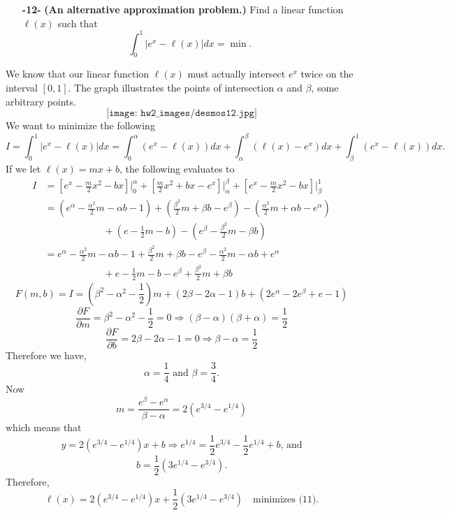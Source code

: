 \documentclass[11pt]{article}
\theoremstyle{definition}
\newcommand{\1}[1]{\mathbf{1} \left \{ #1 \right \}}
\begin{document}
\begin{itemize}
    \item[{\textbf{-12-}}] \textbf{(An alternative approximation problem.)}  Find a linear function $\ell(x)$ such that
    \begin{equation}
        \int_0^1 |e^x - \ell(x)| dx = \min.
    \end{equation}
\end{itemize}
We know that our linear function $\ell(x)$ must actually intersect $e^x$ twice on the interval $[0,1]$.  The graph illustrates the points of intersection $\alpha$ and $\beta$, some arbitrary points.
\[\texttt{[image: hw2\_images/desmos12.jpg]}\]
We want to minimize the following
\[I = \int_0^1 |e^x - \ell(x)| dx = \int_0^{\alpha} (e^x - \ell(x)) dx + \int_{\alpha}^{\beta} (\ell(x) - e^x) dx + \int_{\beta}^1 (e^x - \ell(x)) dx.\]
If we let $\ell(x) = mx+b$, the following evaluates to
\begin{equation*}
    \begin{split}
        I &= \left[e^x - \frac{m}{2}x^2 - bx\right]\bigg|_0^{\alpha} + \left[\frac{m}{2}x^2 + bx - e^x\right]\bigg|_{\alpha}^{\beta} + \left[e^x - \frac{m}{2}x^2 - bx\right]\bigg|_{\beta}^1 \\
        &= \left(e^{\alpha} - \frac{\alpha^2}{2}m - \alpha b - 1\right) + \left(\frac{\beta^2}{2}m + \beta b - e^{\beta}\right) - \left(\frac{\alpha^2}{2}m + \alpha b - e^{\alpha}\right) \\
        & \qquad \qquad \qquad + \left(e - \frac{1}{2}m - b\right) - \left(e^{\beta} - \frac{\beta^2}{2}m - \beta b\right) \\
        &= e^{\alpha} - \frac{\alpha^2}{2}m - \alpha b - 1 + \frac{\beta^2}{2}m + \beta b - e^{\beta} - \frac{\alpha^2}{2}m - \alpha b + e^{\alpha} \\
        & \qquad \qquad \qquad + e - \frac{1}{2}m - b - e^{\beta} + \frac{\beta^2}{2}m + \beta b
    \end{split}
\end{equation*}
\[F(m,b) = I = \left(\beta^2 - \alpha^2 - \frac{1}{2}\right)m + \left(2\beta - 2\alpha - 1\right)b + \left(2e^{\alpha} - 2e^{\beta} + e - 1\right)\]
\[\frac{\partial F}{\partial m} = \beta^2 - \alpha^2 - \frac{1}{2} = 0 \Longrightarrow (\beta - \alpha)(\beta + \alpha) = \frac{1}{2}\]
\[\frac{\partial F}{\partial b} = 2\beta - 2\alpha - 1 = 0 \Longrightarrow \beta - \alpha = \frac{1}{2}\]
Therefore we have,
\[\alpha = \frac{1}{4} \text{  and  } \beta = \frac{3}{4}.\]
Now
\[m = \frac{e^{\beta} - e^{\alpha}}{\beta - \alpha} = 2\left(e^{3/4} - e^{1/4}\right)\]
which means that
\[y = 2\left(e^{3/4} - e^{1/4}\right)x + b \Longrightarrow e^{1/4} = \frac{1}{2}e^{3/4} - \frac{1}{2}e^{1/4} + b \text{, and}\]
\[b = \frac{1}{2}\left(3e^{1/4} - e^{3/4}\right).\]
Therefore,
\[\ell(x) = 2\left(e^{3/4} - e^{1/4}\right)x + \frac{1}{2}\left(3e^{1/4} - e^{3/4}\right) \quad \text{minimizes (11).}\]
\end{document}
